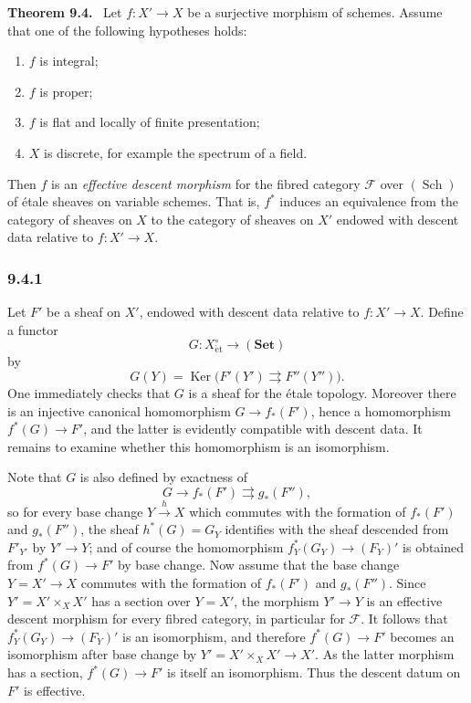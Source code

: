 \documentclass[11pt]{article}
\newcommand{\F}{\mathcal{F}}
\newcommand{\Sch}{\operatorname{Sch}}
\newcommand{\Ker}{\operatorname{Ker}}
\newcommand{\et}{\mathrm{\acute{e}t}}
\newenvironment{statement}[1]{\par\medskip\noindent\textbf{#1.}\ }{\par\medskip}
\begin{document}
\begin{statement}{Theorem 9.4}
Let \(f:X'\to X\) be a surjective morphism of schemes. Assume that one of the following hypotheses holds:
\begin{enumerate}[label=\alph*)]
\item \(f\) is integral;
\item \(f\) is proper;
\item \(f\) is flat and locally of finite presentation;
\item \(X\) is discrete, for example the spectrum of a field.
\end{enumerate}
Then \(f\) is an \emph{effective descent morphism} for the fibred category \(\F\) over \((\Sch)\) of \'etale sheaves on variable schemes. That is, \(f^*\) induces an equivalence from the category of sheaves on \(X\) to the category of sheaves on \(X'\) endowed with descent data relative to \(f:X'\to X\).
\end{statement}

\subsubsection*{9.4.1}
Let \(F'\) be a sheaf on \(X'\), endowed with descent data relative to \(f:X'\to X\). Define a functor
\[
G:X_{\et}^\circ\longrightarrow(\mathbf{Set})
\]
by
\[
G(Y)=\Ker\bigl(F'(Y')\rightrightarrows F''(Y'')\bigr).
\]
One immediately checks that \(G\) is a sheaf for the \'etale topology. Moreover there is an injective canonical homomorphism \(G\to f_*(F')\), hence a homomorphism \(f^*(G)\to F'\), and the latter is evidently compatible with descent data. It remains to examine whether this homomorphism is an isomorphism.

Note that \(G\) is also defined by exactness of
\[
G\longrightarrow f_*(F')\rightrightarrows g_*(F''),
\]
so for every base change \(Y\xrightarrow{h}X\) which commutes with the formation of \(f_*(F')\) and \(g_*(F'')\), the sheaf \(h^*(G)=G_Y\) identifies with the sheaf descended from \(F'_{Y'}\) by \(Y'\to Y\); and of course the homomorphism \(f_Y^*(G_Y)\to (F_Y)'\) is obtained from \(f^*(G)\to F'\) by base change. Now assume that the base change \(Y=X'\to X\) commutes with the formation of \(f_*(F')\) and \(g_*(F'')\). Since \(Y'=X'\times_XX'\) has a section over \(Y=X'\), the morphism \(Y'\to Y\) is an effective descent morphism for every fibred category, in particular for \(\F\). It follows that \(f_Y^*(G_Y)\to(F_Y)'\) is an isomorphism, and therefore \(f^*(G)\to F'\) becomes an isomorphism after base change by \(Y'=X'\times_XX'\to X'\). As the latter morphism has a section, \(f^*(G)\to F'\) is itself an isomorphism. Thus the descent datum on \(F'\) is effective.
\end{document}
